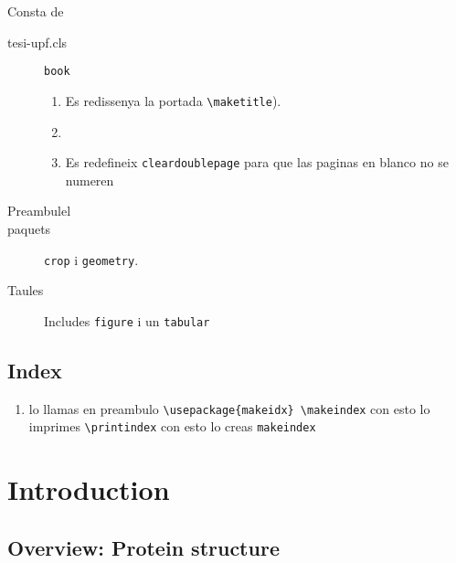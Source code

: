 \documentclass[12pt, a4paper,twoside]{tesi_upf}
\begin{document}
Consta de
\begin{description}
\item[tesi-upf.cls]{\tt book} 
  \begin{enumerate}
  \item Es redissenya la portada  \verb+\maketitle+).

  \item 

  \item Es redefineix {\tt cleardoublepage} para que las paginas en blanco no se numeren
  \end{enumerate}

\item[Preambulel] 
 

\item[paquets] {\tt crop} i {\tt geometry}. 




\item[Taules] Includes \verb+figure+ i un \verb+tabular+ 

\end{description}


\section*{Index}


\begin{enumerate}
\item lo llamas en preambulo  \verb+\usepackage{makeidx} \makeindex+ con esto lo imprimes \verb+\printindex+ con esto lo creas  \verb+makeindex+ 
\end{enumerate}



\chapter{Introduction} \label{introduction} 

\section{Overview: Protein structure}
\end{document}
